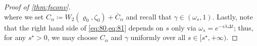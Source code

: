 \documentclass[reqno]{amsart}
\numberwithin{algorithm}{section}
\newcommand{\diff}{\mathrm{d}}
\newcommand{\Xalpha}{{X^\alpha}}
\newcommand{\hh}[1]{{\color{blue}{#1}}}
\begin{document}
{\begin{proof}[Proof of \cref{thm:fsconv}]
\begin{equation*}
    \end{equation*}
    where we set $C_\alpha \coloneqq W_2(\varrho_0, \zeta_0) + \bar{C}_\alpha$ and recall that $\gamma \in (\omega_s, 1 )$.
    Lastly, note that the right hand side of \cref{eq:80,eq:81} depends on $s$ only via $\omega_s = e^{-s \lambda \Delta t}$; thus, for any $s^\star > 0$, we may choose $C_\alpha$ and $\gamma$ uniformly over all $s \in [s^\star, +\infty)$.


\end{proof}}
\end{document}
